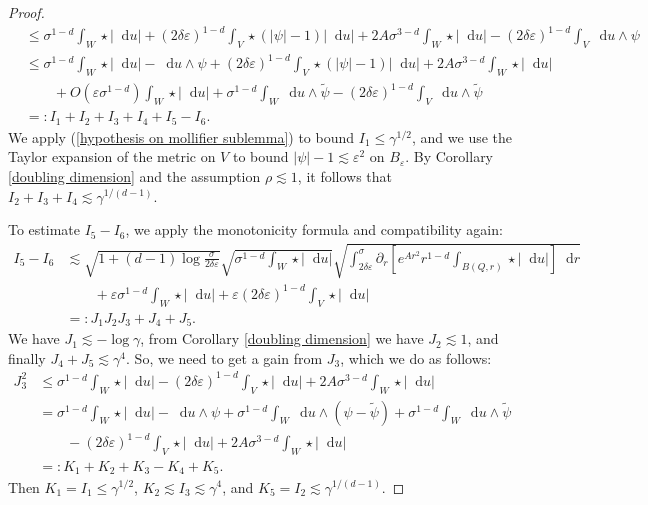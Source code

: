 \documentclass[reqno,10pt]{amsart}
\newcommand*\dif{\mathop{}\!\mathrm{d}}
\theoremstyle{definition}
\numberwithin{equation}{section}
\begin{document}
\begin{proof}
\begin{align*}
&\leq \sigma^{1 - d}\int_W \star |\dif u| + (2\delta\varepsilon)^{1 - d} \int_V \star(|\psi| - 1)|\dif u| + 2A\sigma^{3 - d} \int_W \star |\dif u| - (2\delta\varepsilon)^{1 - d}\int_V \dif u \wedge \psi\\
&\leq \sigma^{1 - d}\int_W \star |\dif u| - \dif u \wedge \psi + (2\delta\varepsilon)^{1 - d} \int_V \star(|\psi| - 1)|\dif u| + 2A\sigma^{3 - d} \int_W \star |\dif u| \\
&\qquad + O(\varepsilon \sigma^{1 - d}) \int_W \star |\dif u| + \sigma^{1 - d}\int_W \dif u \wedge \tilde \psi - (2\delta\varepsilon)^{1 - d}\int_V \dif u \wedge \tilde \psi\\
&=: I_1 + I_2 + I_3 + I_4 + I_5 - I_6.
\end{align*}
We apply (\ref{hypothesis on mollifier sublemma}) to bound $I_1 \leq \gamma^{1/2}$, and we use the Taylor expansion of the metric on $V$ to bound $|\psi| - 1 \lesssim \varepsilon^2$ on $B_\varepsilon$.
By Corollary \ref{doubling dimension} and the assumption $\rho \lesssim 1$, it follows that $I_2 + I_3 + I_4 \lesssim \gamma^{1/(d - 1)}$.

To estimate $I_5 - I_6$, we apply the monotonicity formula and compatibility again:
\begin{align*}
I_5 - I_6 &\lesssim \sqrt{1 + (d - 1) \log \frac{\sigma}{2\delta\varepsilon}} \sqrt{\sigma^{1 - d} \int_W \star |\dif u|} \sqrt{\int_{2\delta\varepsilon}^\sigma \partial_r \left[e^{Ar^2} r^{1 - d} \int_{B(Q, r)} \star |\dif u|\right] \dif r}\\
&\qquad + \varepsilon \sigma^{1 - d} \int_W \star |\dif u| + \varepsilon (2\delta\varepsilon)^{1 - d} \int_V \star |\dif u| \\
&=: J_1 J_2 J_3 + J_4 + J_5.
\end{align*}
We have $J_1 \lesssim -\log \gamma$, from Corollary \ref{doubling dimension} we have $J_2 \lesssim 1$, and finally $J_4 + J_5 \lesssim \gamma^4$.
So, we need to get a gain from $J_3$, which we do as follows:
\begin{align*}
J_3^2 &\leq \sigma^{1 - d} \int_W \star |\dif u| - (2 \delta \varepsilon)^{1 - d} \int_V \star |\dif u| + 2A\sigma^{3 - d} \int_W \star |\dif u| \\
&= \sigma^{1 - d} \int_W \star |\dif u| - \dif u \wedge \psi + \sigma^{1 - d} \int_W \dif u \wedge (\psi - \tilde \psi) + \sigma^{1 - d} \int_W \dif u \wedge \tilde \psi \\
&\qquad - (2 \delta\varepsilon)^{1 - d} \int_V \star |\dif u| + 2A \sigma^{3 - d} \int_W \star |\dif u| \\
&=: K_1 + K_2 + K_3 - K_4 + K_5.
\end{align*}
Then $K_1 = I_1 \leq \gamma^{1/2}$, $K_2 \lesssim I_3 \lesssim \gamma^4$, and $K_5 = I_2 \lesssim \gamma^{1/(d - 1)}$.


\end{proof}
\end{document}
